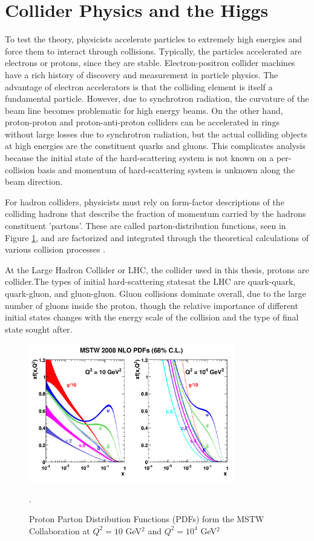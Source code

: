 \section{Collider Physics and the Higgs} 

To test the theory, physicists accelerate particles to extremely high energies and force
them to interact through collisions. Typically, the particles accelerated are
electrons or protons, since they are stable. Electron-positron collider
machines have a rich history of discovery and measurement in particle physics.
The advantage of electron accelerators is that the colliding element is itself
a fundamental particle. However, due to synchrotron radiation, the curvature of the
beam line becomes problematic for high energy beams.  On the other
hand, proton-proton and proton-anti-proton colliders can be accelerated in rings without large losses
due to synchrotron radiation, but the actual colliding objects at high
energies are the constituent quarks and gluons. This complicates analysis
because the initial state of the hard-scattering system is not known on a per-collision
basis and momentum of hard-scattering system is unknown along the beam direction.

For hadron colliders, physicists must rely on form-factor descriptions of the colliding hadrons
that describe the fraction of momentum carried by the
hadrons constituent 'partons'.  These are called parton-distribution
functions, seen in Figure \ref{figure:theory_pdf}, and are factorized
and integrated through the theoretical calculations of various collision processes \cite{1985.Collins.factorization-theorem}.

At the Large Hadron Collider or LHC, the collider used in this thesis, protons are collider.The types of initial hard-scattering statesat the LHC are quark-quark, quark-gluon, and gluon-gluon. Gluon collisions dominate overall,
  due to the large number of gluons inside the proton, though the relative importance of different initial states changes with the
  energy scale of the collision and the type of final state sought after.  

\begin{figure}[!t]
\centering 
\includegraphics[width=0.8\textwidth]{figs/theory/mstw2008nlo68cl_allpdfs.pdf}
\caption {Proton Parton Distribution Functions (PDFs) form the MSTW Collaboration at $Q^2 = 10$ GeV$^2$ and $Q^2 = 10^4$ GeV$^2$}.
\label{figure:theory_pdf}
\end{figure}


